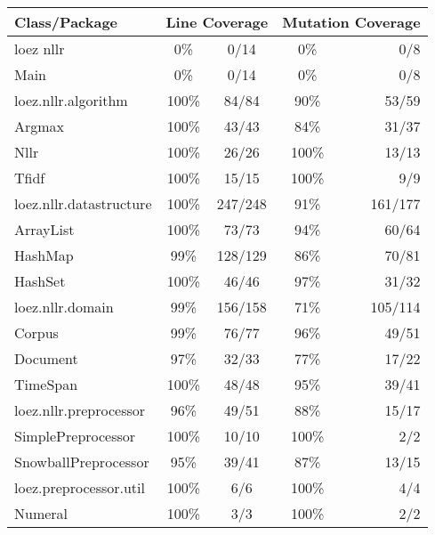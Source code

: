 \documentclass[12pt,a4paper]{article}
\begin{document}
\begin{tabular}{l |c |c |c |r}
\textbf{Class/Package}		&	\multicolumn{2}{|c}{\textbf{Line Coverage}} & \multicolumn{2}{|c}{\textbf{Mutation Coverage}} \\
\hline
loez nllr				&	0\%	 	& 0/14		& 0\%	& 0/8 	\\
\hspace{10 mm}Main 		&	0\%	 	& 0/14		& 0\%	& 0/8 	\\
\hline
loez.nllr.algorithm	&	100\% 	& 84/84 		& 90\%	& 53/59 	\\
\hspace{10 mm}Argmax			&	100\%	& 43/43		& 84\%	& 31/37 \\
\hspace{10 mm}Nllr			&	100\%	& 26/26		& 100\% 	& 13/13 \\
\hspace{10 mm}Tfidf			&	100\%	& 15/15		& 100\%	& 9/9 \\ 
\hline
loez.nllr.datastructure&	100\%	& 247/248	& 91\%	& 161/177 \\
\hspace{10 mm}ArrayList		&	100\%	&	73/73	& 94\%	&	60/64 \\
\hspace{10 mm}HashMap		&	99\%		&	128/129	& 86\%	&	70/81 \\
\hspace{10 mm}HashSet		&	100\%	&	46/46	& 97\%	&	31/32 \\
\hline
loez.nllr.domain & 99\%	&	156/158 	& 	71\%		&	105/114 \\
\hspace{10 mm}Corpus	&	99\%	&	76/77	&	96\%		&	49/51 \\
\hspace{10 mm}Document	&	97\%	&	32/33	&	77\%		&	17/22 \\
\hspace{10 mm}TimeSpan	&	100\%	&	48/48	&	95\%		&	39/41 \\
\hline
loez.nllr.preprocessor & 96\% & 49/51 & 88\% & 15/17 \\
\hspace{10 mm}SimplePreprocessor & 100\% & 10/10 & 100\% & 2/2 \\
\hspace{10 mm}SnowballPreprocessor & 95\% & 39/41 & 87\% & 13/15 \\ 
\hline
loez.preprocessor.util & 100\% & 6/6 & 100\% & 4/4 \\
\hspace{10 mm}Numeral & 100\% & 3/3 & 100\% & 2/2 \\

\end{tabular}
\end{document}
